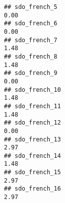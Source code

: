 \documentclass[
]{article}
\begin{document}
\begin{verbatim}
## sdo_french_5                                                                                                                                                                                                                 0.00
## sdo_french_6                                                                                                                                                                                                                 0.00
## sdo_french_7                                                                                                                                                                                                                 1.48
## sdo_french_8                                                                                                                                                                                                                 1.48
## sdo_french_9                                                                                                                                                                                                                 0.00
## sdo_french_10                                                                                                                                                                                                                1.48
## sdo_french_11                                                                                                                                                                                                                1.48
## sdo_french_12                                                                                                                                                                                                                0.00
## sdo_french_13                                                                                                                                                                                                                2.97
## sdo_french_14                                                                                                                                                                                                                1.48
## sdo_french_15                                                                                                                                                                                                                2.97
## sdo_french_16                                                                                                                                                                                                                2.97

\end{verbatim}
\end{document}
